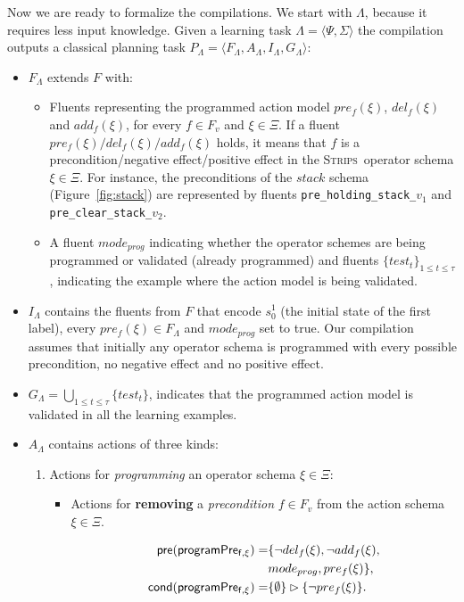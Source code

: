 \documentclass{article}
\newcommand{\tup}[1]{{\langle #1 \rangle}}
\newcommand{\pre}{\mathsf{pre}}     %
\newcommand{\cond}{\mathsf{cond}}   %
\newcommand{\strips}{\textsc{Strips}}     %
\begin{document}
Now we are ready to formalize the compilations. We start with $\Lambda$, because it requires less input knowledge. Given a learning task $\Lambda=\tup{\Psi,\Sigma}$ the compilation outputs a classical planning task $P_{\Lambda}=\tup{F_{\Lambda},A_{\Lambda},I_{\Lambda},G_{\Lambda}}$:
\begin{itemize}
\item $F_{\Lambda}$ extends $F$ with:
\begin{itemize}
\item Fluents representing the programmed action model $pre_f(\xi)$, $del_f(\xi)$ and $add_f(\xi)$, for every $f\in F_v$ and $\xi \in \Xi$. If a fluent $pre_f(\xi)/del_f(\xi)/add_f(\xi)$ holds, it means that $f$ is a precondition/negative effect/positive effect in the \strips\ operator schema $\xi\in \Xi$. For instance, the preconditions of the $stack$ schema (Figure~\ref{fig:stack}) are represented by fluents {\small\tt pre\_holding\_stack\_$v_1$} and {\small\tt pre\_clear\_stack\_$v_2$}.
\item A fluent $mode_{prog}$ indicating whether the operator schemes are being programmed or validated (already programmed) and fluents $\{test_t\}_{1\leq t\leq \tau}$, indicating the example where the action model is being validated.
\end{itemize}
\item $I_{\Lambda}$ contains the fluents from $F$ that encode $s_0^1$ (the initial state of the first label), every $pre_f(\xi)\in F_{\Lambda}$ and $mode_{prog}$ set to true. Our compilation assumes that initially any operator schema is programmed with every possible precondition, no negative effect and no positive effect.
\item $G_{\Lambda}=\bigcup_{1\leq t\leq \tau}\{test_t\}$, indicates that the programmed action model is validated in all the learning examples.
\item $A_{\Lambda}$ contains actions of three kinds:
\begin{enumerate}
\item Actions for {\em programming} an operator schema $\xi\in\Xi$:
\begin{itemize}
\item Actions for {\bf removing} a {\em precondition} $f\in F_v$ from the action schema $\xi\in\Xi$.

\begin{small}
\begin{align*}
\hspace*{7pt}\pre(\mathsf{programPre_{f,\xi}})=&\{\neg del_{f}(\xi),\neg add_{f}(\xi),\\
& mode_{prog}, pre_{f}(\xi)\},\\
\cond(\mathsf{programPre_{f,\xi}})=&\{\emptyset\}\rhd\{\neg pre_{f}(\xi)\}.
\end{align*}
\end{small}


\end{itemize}
\end{enumerate}
\end{itemize}
\end{document}

